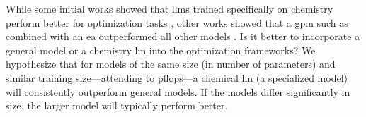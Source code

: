 While some initial works showed that \glspl{llm} trained specifically on chemistry perform better for optimization tasks \autocite{kristiadi2024sober}, other works showed that a \gls{gpm} such as  combined with an \gls{ea} outperformed all other models \autocite{wang2024efficient}.
Is it better to incorporate a general model or a chemistry \gls{lm} into the optimization frameworks?
We hypothesize that for models of the same size (in number of parameters) and similar training size---attending to \glspl{pflop}---a chemical \gls{lm} (a specialized model) will consistently outperform general models. 
If the models differ significantly in size, the larger model will typically perform better.
